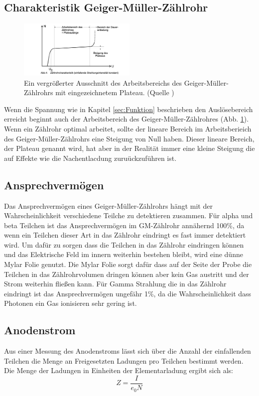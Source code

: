\subsection{Charakteristik Geiger-Müller-Zählrohr}
\begin{figure}
    \centering
    \includegraphics[width=0.5\textwidth]{bilder/Zaehlrohr_N_U_Graph.png}
    \caption{Ein vergrößerter Ausschnitt des Arbeitsbereichs des Geiger-Müller-Zählrohrs mit eingezeichnetem Plateau. (Quelle \cite{Anleitung})}
    \label{fig:Zaehlrohr_N_U_Graph}
\end{figure}
Wenn die Spannung wie in Kapitel \ref{sec:Funktion} beschrieben den Auslösebereich erreicht beginnt auch der Arbeitsbereich des Geiger-Müller-Zählrohres (Abb. \ref{fig:Zaehlrohr_N_U_Graph}).
Wenn ein Zählrohr optimal arbeitet, sollte der lineare Bereich im Arbeitsberieich des Geiger-Müller-Zählrohrs eine Steigung von Null haben.
Dieser lineare Bereich, der Plateau genannt wird, hat aber in der Realität immer eine kleine Steigung die auf Effekte wie die Nachentlacdung zuruückzuführen ist.
\subsection{Ansprechvermögen}
Das Ansprechvermögen eines Geiger-Müller-Zählrohrs hängt mit der Wahrscheinlichkeit verschiedene  Teilche  zu detektieren zusammen.
Für alpha und beta Teilchen ist das Ansprechvermögen im GM-Zählrohr annähernd 100\%, da wenn ein Teilchen dieser Art in das Zählrohr eindringt es fast immer detektiert wird.
Um dafür zu sorgen dass die Teilchen in das Zählrohr eindringen können und das Elektrische Feld im innern weiterhin bestehen bleibt, wird eine dünne Mylar Folie genutzt.
Die Mylar Folie sorgt dafür dass auf der Seite der Probe die Teilchen in das Zählrohrvolumen dringen können aber kein Gas austritt und der Strom weiterhin fließen kann.
Für Gamma Strahlung die in das Zählrohr eindringt ist das Ansprechvermögen ungefähr 1\%, da die Wahrscheinlichkeit dass Photonen ein Gas ionisieren sehr gering ist.
\subsection{Anodenstrom}
Aus einer Messung des Anodenstroms lässt sich über die Anzahl der einfallenden Teilchen die Menge an Freigesetzten Ladungen pro Teilchen bestimmt werden.
Die Menge der Ladungen in Einheiten der Elementarladung ergibt sich als:
\begin{equation}
    Z = \frac{I}{e_0 N} \label{eqn:Ladungsmenge}
\end{equation}